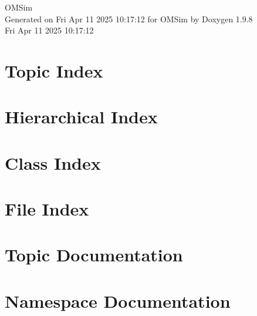 \documentclass[twoside]{book}
\newcommand{\+}{\discretionary{\mbox{\scriptsize$\hookleftarrow$}}{}{}}
\newcommand{\clearemptydoublepage}{%
    \newpage{\pagestyle{empty}\cleardoublepage}%
  }
\begin{document}
  \raggedbottom
    \hypersetup{pageanchor=false,
                bookmarksnumbered=true,
                pdfencoding=unicode
               }
  \begin{titlepage}
  \vspace*{7cm}
  \begin{center}%
  {\Large OMSim}\\
  \vspace*{1cm}
  {\large Generated on Fri Apr 11 2025 10\+:17\+:12 for OMSim by Doxygen 1.9.8}\\
    \vspace*{0.5cm}
    {\small Fri Apr 11 2025 10:17:12}
  \end{center}
  \end{titlepage}
  \clearemptydoublepage
  \tableofcontents
  \clearemptydoublepage
  \hypersetup{pageanchor=true}








\chapter{Topic Index}

\chapter{Hierarchical Index}

\chapter{Class Index}

\chapter{File Index}

\chapter{Topic Documentation}




\chapter{Namespace Documentation}



\end{document}
